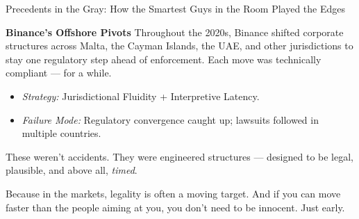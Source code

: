 \begin{HistoricalSidebar}{Precedents in the Gray: How the Smartest Guys in the Room Played the Edges}
  \medskip
  
  \textbf{Binance’s Offshore Pivots}  
  Throughout the 2020s, Binance shifted corporate structures across Malta, the Cayman Islands, the UAE, and other jurisdictions  
  to stay one regulatory step ahead of enforcement.  
  Each move was technically compliant — for a while.
  
  \begin{itemize}
    \item \textit{Strategy:} Jurisdictional Fluidity + Interpretive Latency.
    \item \textit{Failure Mode:} Regulatory convergence caught up; lawsuits followed in multiple countries.
  \end{itemize}
  
  \medskip
  
  These weren’t accidents.  
  They were engineered structures — designed to be legal, plausible, and above all, \textit{timed}.
  
  Because in the markets, legality is often a moving target.  
  And if you can move faster than the people aiming at you,  
  you don’t need to be innocent.  
  Just early.
  
\end{HistoricalSidebar}

\medskip

